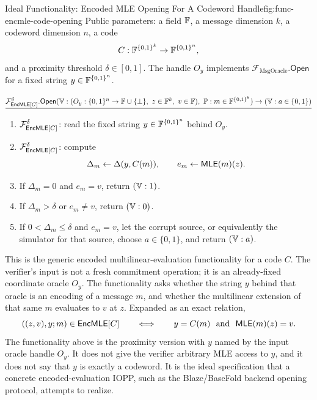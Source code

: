 \begin{protocolbox}{Ideal Functionality: Encoded MLE Opening For A Codeword Handle}{fig:func-encmle-code-opening}
\noindent Public parameters: a field \(\mathbb{F}\), a message dimension \(k\), a
codeword dimension \(n\), a code
\[
  C:\mathbb{F}^{\{0,1\}^k}\to\mathbb{F}^{\{0,1\}^n},
\]
and a proximity threshold \(\delta\in[0,1]\).  The handle \(O_y\) implements
\(\mathcal F_{\mathrm{MsgOracle}}.\mathsf{Open}\) for a fixed string
\(y\in\mathbb{F}^{\{0,1\}^n}\).

\smallskip
\noindent\(\underline{\mathcal F_{\EncMLE[C]}^\delta.\mathsf{Open}(\verifier:(O_y:\B^n\to\F\cup\{\bot\},\ z\in\F^k,\ v\in\F),\ \prover:m\in\F^{\B^k})\to(\verifier:a\in\{0,1\})}\)

\smallskip
\begin{enumerate}[leftmargin=0.24in,label=\textbf{R\arabic*.},itemsep=0.08em,topsep=0.1em,parsep=0pt]
  \item \(\mathcal F_{\mathsf{EncMLE}[C]}^\delta\): read the fixed string
        \(y\in\mathbb{F}^{\{0,1\}^n}\) behind \(O_y\).
  \item \(\mathcal F_{\mathsf{EncMLE}[C]}^\delta\): compute
        \[
          \Delta_m\gets\Delta(y,C(m)),
          \qquad
          e_m\gets \mathsf{MLE}(m)(z).
        \]
  \item If \(\Delta_m=0\) and \(e_m=v\), return \((\mathbb{V}:1)\).
  \item If \(\Delta_m>\delta\) or \(e_m\ne v\), return \((\mathbb{V}:0)\).
  \item If \(0<\Delta_m\le\delta\) and \(e_m=v\), let the corrupt source, or
        equivalently the simulator for that source, choose
        \(a\in\{0,1\}\), and return \((\mathbb{V}:a)\).
\end{enumerate}
\end{protocolbox}

This is the generic encoded multilinear-evaluation functionality for a code
\(C\).  The verifier's input is not a fresh commitment operation; it is an
already-fixed coordinate oracle \(O_y\).  The functionality asks whether the
string \(y\) behind that oracle is an encoding of a message \(m\), and whether
the multilinear extension of that same \(m\) evaluates to \(v\) at \(z\).
Expanded as an exact relation,
\[
  ((z,v),y;m)\in\mathsf{EncMLE}[C]
  \qquad\Longleftrightarrow\qquad
  y=C(m)\ \text{ and }\ \mathsf{MLE}(m)(z)=v.
\]
The functionality above is the proximity version with \(y\) named by the input
oracle handle \(O_y\).  It does not give the verifier arbitrary MLE access to
\(y\), and it does not say that \(y\) is exactly a codeword.  It is the ideal
specification that a concrete encoded-evaluation IOPP, such as the
Blaze/BaseFold backend opening protocol, attempts to realize.

